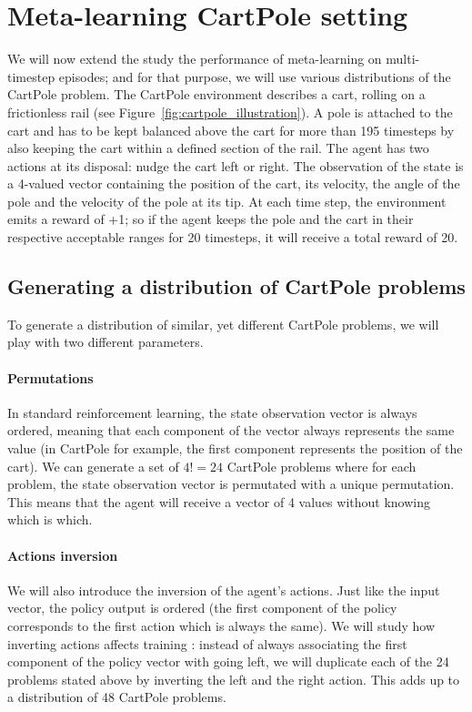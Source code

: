 \section{Meta-learning CartPole setting}
\label{sec:setting}
We will now extend the study the performance of meta-learning on multi-timestep
episodes; and for that purpose, we will use various distributions of 
the CartPole problem. The CartPole environment describes a cart, rolling on 
a frictionless rail (see Figure~\ref{fig:cartpole_illustration}). 
A pole is attached to the cart and has to be kept balanced
above the cart for more than 195 timesteps by also keeping the cart within a 
defined section of the rail. The agent has two actions at its disposal: nudge
the cart left or right. The observation of the state is a 4-valued vector 
containing the position of the cart, its velocity, the angle of the pole and
the velocity of the pole at its tip. At each time step, the environment emits
a reward of +1; so if the agent keeps the pole and the cart in their 
respective acceptable ranges for 20 timesteps, it will receive a total reward
of 20.\\


\subsection{Generating a distribution of CartPole problems}
To generate a distribution of similar, yet different CartPole problems, we
will play with two different parameters.

\paragraph{Permutations} In standard reinforcement learning, the state
observation vector is always ordered, meaning that each component of the vector
always represents the same value (in CartPole for example, the first component
represents the position of the cart). We can generate a set of $4! = 24$
CartPole problems where for each problem, the state observation vector is
permutated with a unique permutation. This means that the agent will
receive a vector of 4 values without knowing which is which.

\paragraph{Actions inversion} We will also introduce the inversion of the
agent's actions. Just like the input vector, the policy output is ordered
(the first component of the policy corresponds to the first action which is
always the same). We will study how inverting actions affects training : instead
of always associating the first component of the policy vector with going left,
we will duplicate each of the 24 problems stated above by inverting the left
and the right action. This adds up to a distribution of 48 CartPole problems.\\

